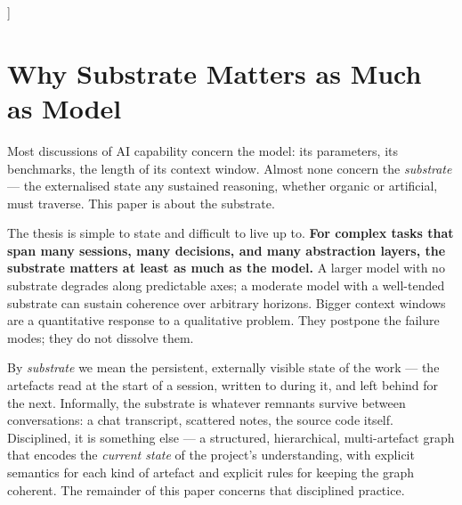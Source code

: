 \documentclass[11pt,a4paper,twocolumn]{article}
\begin{document}
\begin{@twocolumnfalse}
\begin{abstract}
what no pipeline can derive --- so the discipline's purpose has a
one-line statement: separate genuine human creative input from
cognitive load. The discipline defines six artefact categories
--- Knowledge Bases, Inventories, Data Dictionaries, Decision
Records, Open Questions, Glossary --- a status lifecycle, an edit
protocol with explicit anti-patterns and a trivial-fix lane, and
forward/reverse propagation rules across the hierarchy. Its
posture is \emph{human-governed, agent-executed}: a five-layer
adoption stack progressively delegates substrate execution to
agents while intent, decision, and scope authority remain with the
person. The practice is domain-agnostic --- software engineering
appears here only as the worked instance --- and practicable today
with no special tooling. We claim the substrate matters as much as
the model, and that this is the form of work AI raises in
importance --- not invents.
\vspace{6pt}
\end{abstract}
\end{@twocolumnfalse}
]

\section{Why Substrate Matters as Much as Model}

Most discussions of AI capability concern the model: its parameters,
its benchmarks, the length of its context window. Almost none concern
the \emph{substrate} --- the externalised state any sustained
reasoning, whether organic or artificial, must traverse. This paper
is about the substrate.

The thesis is simple to state and difficult to live up to.
\textbf{For complex tasks that span many sessions, many decisions,
and many abstraction layers, the substrate matters at least as much
as the model.} A larger model with no substrate degrades along
predictable axes; a moderate model with a well-tended substrate can
sustain coherence over arbitrary horizons. Bigger context windows
are a quantitative response to a qualitative problem. They postpone
the failure modes; they do not dissolve them.

By \emph{substrate} we mean the persistent, externally visible state
of the work --- the artefacts read at the start of a session,
written to during it, and left behind for the next. Informally, the
substrate is whatever remnants survive between conversations: a chat
transcript, scattered notes, the source code itself. Disciplined,
it is something else --- a structured, hierarchical, multi-artefact
graph that encodes the \emph{current state} of the project's
understanding, with explicit semantics for each kind of artefact and
explicit rules for keeping the graph coherent. The remainder of this
paper concerns that disciplined practice.
\end{document}

